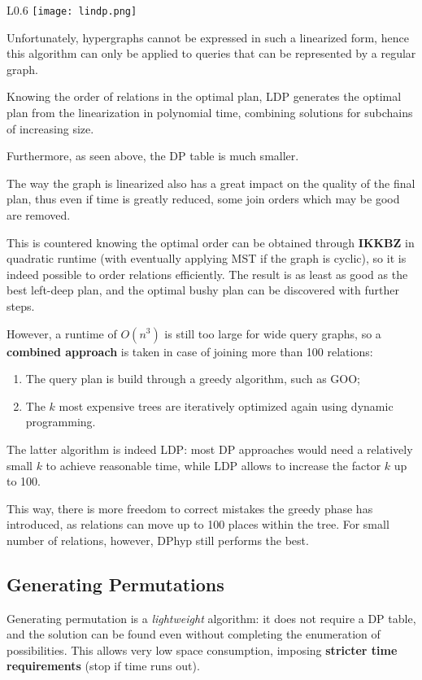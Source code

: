 \begin{wrapfigure}{L}{0.6\textwidth}
	\vspace{-18pt}
	\texttt{[image: lindp.png]}
	\vspace{-30pt}
\end{wrapfigure}

Unfortunately, hypergraphs cannot be expressed in such a linearized form, hence this algorithm can only be applied to queries that can be represented by a regular graph.

Knowing the order of relations in the optimal plan, LDP generates the optimal plan from the linearization in polynomial time, combining solutions for subchains of increasing size. 

Furthermore, as seen above, the DP table is much smaller.

The way the graph is linearized also has a great impact on the quality of the final plan, thus even if time is greatly reduced, some join orders which may be good are removed.

This is countered knowing the optimal order can be obtained through \textbf{IKKBZ} in quadratic runtime (with eventually applying MST if the graph is cyclic), so it is indeed possible to order relations efficiently. The result is as least as good as the best left-deep plan, and the optimal bushy plan can be discovered with further steps.

However, a runtime of $O(n^3)$ is still too large for wide query graphs, so a \textbf{combined approach} is taken in case of joining more than 100 relations:
\begin{enumerate}
	\item The query plan is build through a greedy algorithm, such as GOO;
	\item The $k$ most expensive trees are iteratively optimized again using dynamic programming.
\end{enumerate}

The latter algorithm is indeed LDP: most DP approaches would need a relatively small $k$ to achieve reasonable time, while LDP allows to increase the factor $k$ up to 100.

This way, there is more freedom to correct mistakes the greedy phase has introduced, as relations can move up to 100 places within the tree. For small number of relations, however, DPhyp still performs the best. 

\subsection{Generating Permutations}
Generating permutation is a \textit{lightweight} algorithm: it does not require a DP table, and the solution can be found even without completing the enumeration of possibilities. This allows very low space consumption, imposing \textbf{stricter time requirements} (stop if time runs out).

